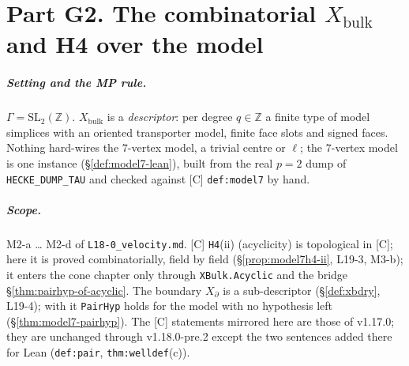 
\chapter{Part G2. The combinatorial \texorpdfstring{$X_{\mathrm{bulk}}$}{X\_bulk} and H4 over the model}\label{ch:xbulk}

\paragraph{Setting and the MP rule.} $\Gamma=\mathrm{SL}_2(\mathbb Z)$. $X_{\mathrm{bulk}}$ is a \emph{descriptor}: per degree
$q\in\mathbb Z$ a finite type of model simplices with an oriented transporter model, finite face slots and signed faces.
Nothing hard-wires the $7$-vertex model, a trivial centre or $\ell$; the $7$-vertex model is one instance
(\S\ref{def:model7-lean}), built from the real $p=2$ dump of \texttt{HECKE\_DUMP\_TAU} and checked against [C]
\texttt{def:model7} by hand.

\paragraph{Scope.} M2-a \ldots{} M2-d of \texttt{L18-0\_velocity.md}. [C] \texttt{H4}(ii) (acyclicity) is topological in [C];
here it is proved combinatorially, field by field (\S\ref{prop:model7h4-ii}, L19-3, M3-b); it enters the cone chapter
only through \texttt{XBulk.Acyclic} and the bridge \S\ref{thm:pairhyp-of-acyclic}. The boundary $X_\partial$ is a sub-descriptor
(\S\ref{def:xbdry}, L19-4); with it \texttt{PairHyp} holds for the model with no hypothesis left (\S\ref{thm:model7-pairhyp}).
The [C] statements mirrored here are those of v1.17.0; they are unchanged through v1.18.0-pre.2 except the two sentences
added there for Lean (\texttt{def:pair}, \texttt{thm:welldef}(c)).

